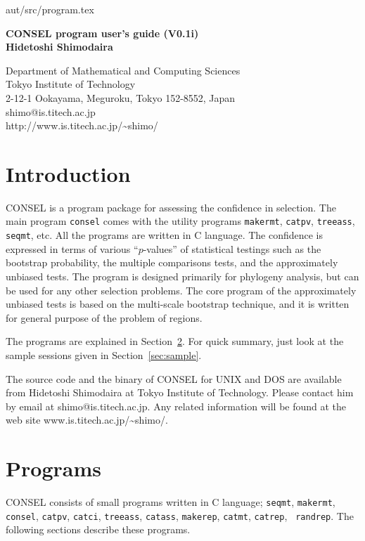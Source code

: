 \documentclass[12pt]{article}
\newcommand{\refsec}[1]{Section~\ref{sec:#1}}
\begin{document}
{aut/src/program.tex\hfill \documentid}
\begin{center}
 \bf\large CONSEL program user's guide (V0.1i)\\[3ex]
 Hidetoshi Shimodaira\\[2ex]
 \normalsize

 Department of Mathematical and Computing Sciences \\
 Tokyo Institute of Technology \\
 2-12-1 Ookayama, Meguroku, Tokyo 152-8552, Japan\\
 shimo@is.titech.ac.jp\\
 http://www.is.titech.ac.jp/\~{}shimo/
\end{center}

\section{Introduction}

CONSEL is a program package for assessing the confidence in
selection. The main program {\tt consel} comes with the utility programs
{\tt makermt}, {\tt catpv}, {\tt treeass}, {\tt seqmt}, etc. All the
programs are written in C language. The confidence is expressed in terms
of various ``$p$-values'' of statistical testings such as the bootstrap
probability, the multiple comparisons tests, and the approximately
unbiased tests. The program is designed primarily for phylogeny
analysis, but can be used for any other selection problems. The core
program of the approximately unbiased tests is based on the multi-scale
bootstrap technique, and it is written for general purpose of the
problem of regions.

The programs are explained in \refsec{usage}.  For quick summary, just
look at the sample sessions given in \refsec{sample}.

The source code and the binary of CONSEL for UNIX and DOS are available
from Hidetoshi Shimodaira at Tokyo Institute of Technology. Please
contact him by email at shimo@is.titech.ac.jp. Any related information
will be found at the web site www.is.titech.ac.jp/\~{}shimo/.



\section{Programs} \label{sec:usage}

CONSEL consists of small programs written in C language; {\tt seqmt},
{\tt makermt}, {\tt consel}, {\tt catpv}, {\tt catci}, {\tt treeass},
{\tt catass}, {\tt makerep}, {\tt catmt}, {\tt catrep}, {\tt
randrep}. The following sections describe these programs.
\end{document}
